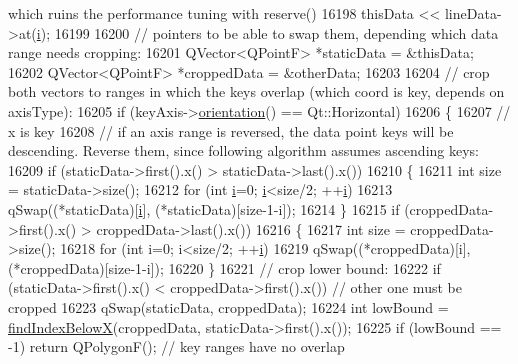 \begin{DoxyCode}
{       which ruins the performance tuning with reserve()}
16198     thisData << lineData->at(\hyperlink{_comparision_pictures_2_createtest_image_8m_a6f6ccfcf58b31cb6412107d9d5281426}{i});
16199   
16200   \textcolor{comment}{// pointers to be able to swap them, depending which data range needs cropping:}
16201   QVector<QPointF> *staticData = &thisData;
16202   QVector<QPointF> *croppedData = &otherData;
16203   
16204   \textcolor{comment}{// crop both vectors to ranges in which the keys overlap (which coord is key, depends on axisType):}
16205   \textcolor{keywordflow}{if} (keyAxis->\hyperlink{class_q_c_p_axis_a57483f2f60145ddc9e63f3af53959265}{orientation}() == Qt::Horizontal)
16206   \{
16207     \textcolor{comment}{// x is key}
16208     \textcolor{comment}{// if an axis range is reversed, the data point keys will be descending. Reverse them, since following
       algorithm assumes ascending keys:}
16209     \textcolor{keywordflow}{if} (staticData->first().x() > staticData->last().x())
16210     \{
16211       \textcolor{keywordtype}{int} size = staticData->size();
16212       \textcolor{keywordflow}{for} (\textcolor{keywordtype}{int} \hyperlink{_comparision_pictures_2_createtest_image_8m_a6f6ccfcf58b31cb6412107d9d5281426}{i}=0; \hyperlink{_comparision_pictures_2_createtest_image_8m_a6f6ccfcf58b31cb6412107d9d5281426}{i}<size/2; ++\hyperlink{_comparision_pictures_2_createtest_image_8m_a6f6ccfcf58b31cb6412107d9d5281426}{i})
16213         qSwap((*staticData)[\hyperlink{_comparision_pictures_2_createtest_image_8m_a6f6ccfcf58b31cb6412107d9d5281426}{i}], (*staticData)[size-1-i]);
16214     \}
16215     \textcolor{keywordflow}{if} (croppedData->first().x() > croppedData->last().x())
16216     \{
16217       \textcolor{keywordtype}{int} size = croppedData->size();
16218       \textcolor{keywordflow}{for} (\textcolor{keywordtype}{int} i=0; i<size/2; ++\hyperlink{_comparision_pictures_2_createtest_image_8m_a6f6ccfcf58b31cb6412107d9d5281426}{i})
16219         qSwap((*croppedData)[i], (*croppedData)[size-1-i]);
16220     \}
16221     \textcolor{comment}{// crop lower bound:}
16222     \textcolor{keywordflow}{if} (staticData->first().x() < croppedData->first().x()) \textcolor{comment}{// other one must be cropped}
16223       qSwap(staticData, croppedData);
16224     \textcolor{keywordtype}{int} lowBound = \hyperlink{class_q_c_p_graph_a6f4e9461d5925be9228fc4760249a04f}{findIndexBelowX}(croppedData, staticData->first().x());
16225     \textcolor{keywordflow}{if} (lowBound == -1) \textcolor{keywordflow}{return} QPolygonF(); \textcolor{comment}{// key ranges have no overlap}

\end{DoxyCode}
